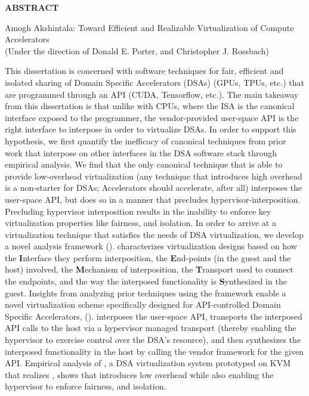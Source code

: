 \begin{center}
\vspace*{52pt}
{\normalfont\textbf{ABSTRACT}}
\vspace{11pt}

\begin{singlespace}
Amogh Akshintala: Toward Efficient and Realizable Virtualization of Compute Accelerators \\
(Under the direction of Donald E. Porter, and Christopher J. Rossbach)
\end{singlespace}
\end{center}

This dissertation is concerned with software techniques for fair, efficient
and isolated sharing of Domain Specific Accelerators (DSAs) (GPUs, TPUs, etc.)
that are programmed through an API (CUDA, Tensorflow, etc.).
The main takeaway from this dissertation is that unlike with CPUs, where the
ISA is the canonical interface exposed to the programmer, the vendor-provided
user-space API is the right interface to interpose in order to virtualize
DSAs. In order to support this hypothesis, we first quantify the inefficacy of
canonical techniques from prior work that interpose on other interfaces in the
DSA software stack through empirical analysis. We find that the only canonical
technique that is able to provide low-overhead virtualization (any technique
that introduces high overhead is a non-starter for DSAs; Accelerators should
accelerate, after all) interposes the user-space API, but does so in a manner
that precludes hypervisor-interposition. Precluding hypervisor interposition
results in the inability to enforce key virtualization properties like
fairness, and isolation. In order to arrive at a virtualization technique that
satisfies the needs of DSA virtualization, we develop a novel analysis
framework (\iemts). \iemts characterizes virtualization designs based on how
the \textbf{I}nterface they perform interposition, the \textbf{E}nd-points
(in the guest and the host) involved, the \textbf{M}echanism of interposition,
the \textbf{T}ransport used to connect the endpoints, and the way the
interposed functionality is \textbf{S}ynthesized in the guest. Insights from
analyzing prior techniques using the \iemts framework enable a novel
virtualization scheme specifically designed for API-controlled Domain Specific
Accelerators, \hirafull (\hira). \hira interposes the user-space API,
transports the interposed API calls to the host via a hypervisor managed
transport (thereby enabling the hypervisor to exercise control over the DSA's
resource), and then synthesizes the interposed functionality in the host by
calling the vendor framework for the given API. Empirical analysis of \AvA, a
DSA virtualization system prototyped on KVM that realizes \hira, shows that
\hira introduces low overhead while also enabling the hypervisor to enforce
fairness, and isolation.

\clearpage